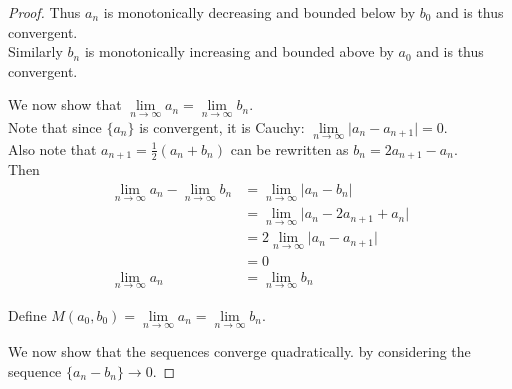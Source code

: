 \documentclass[12pt]{article}
\begin{document}
\begin{proof}
		Thus ${a_n}$ is monotonically decreasing and bounded below by $b_0$ and is thus convergent. \\
		Similarly ${b_n}$ is monotonically increasing and bounded above by $a_0$ and is thus convergent. \bigbreak
		
		We now show that $\lim\limits_{n \to \infty}a_n = \lim\limits_{n \to \infty}b_n$. \\
		Note that since $\{a_n\}$ is convergent, it is Cauchy: $\lim\limits_{n \to \infty}\vert a_n - a_{n+1} \vert = 0$. \\
		Also note that $a_{n+1} = \frac{1}{2}(a_n + b_n)$ can be rewritten as $b_n = 2a_{n+1} - a_{n}$. \\
		Then \\
		\begin{align*}
			\lim\limits_{n \to \infty} a_n - \lim\limits_{n \to \infty} b_n  &= \lim\limits_{n \to \infty}\vert a_n - b_n \vert  \\
			& = \lim\limits_{n \to \infty} \vert a_n - 2a_{n+1} + a_{n} \vert  \\
			& = 2\lim\limits_{n \to \infty} \vert a_n - a_{n+1} \vert \\
			& = 0 \\
			\lim\limits_{n \to \infty} a_n & = \lim\limits_{n \to \infty} b_n
		\end{align*}
		
		Define $M(a_{0}, b_{0}) = \lim\limits_{n \to \infty} a_n = \lim\limits_{n \to \infty} b_n$. \bigbreak
		
		We now show that the sequences converge quadratically. by considering the sequence $\{a_n-b_n\} \to 0$. \bigbreak
		

\end{proof}
\end{document}
